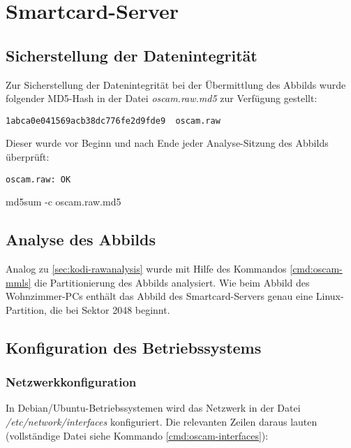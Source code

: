 \section{Smartcard-Server}

\subsection{Sicherstellung der Datenintegrität}

Zur Sicherstellung der Datenintegrität bei der Übermittlung des Abbilds wurde folgender MD5-Hash in der Datei \textit{oscam.raw.md5} zur Verfügung gestellt:

\begin{verbatim}
1abca0e041569acb38dc776fe2d9fde9  oscam.raw
\end{verbatim}

Dieser wurde vor Beginn und nach Ende jeder Analyse-Sitzung des Abbilds überprüft:

\begin{cmd}
\begin{verbatim}
oscam.raw: OK
\end{verbatim}
\caption{md5sum -c oscam.raw.md5}
\end{cmd}

\subsection{Analyse des Abbilds}

Analog zu \autoref{sec:kodi-rawanalysis} wurde mit Hilfe des Kommandos \autoref{cmd:oscam-mmls} die Partitionierung des Abbilds analysiert. Wie beim Abbild des Wohnzimmer-PCs enthält das Abbild des Smartcard-Servers genau eine Linux-Partition, die bei Sektor 2048 beginnt.

\subsection{Konfiguration des Betriebssystems}

\subsubsection{Netzwerkkonfiguration}
\label{sec:cardserver-network}

In Debian/Ubuntu-Betriebssystemen wird das Netzwerk in der Datei \textit{/etc/network/interfaces} konfiguriert. Die relevanten Zeilen daraus lauten (vollständige Datei siehe Kommando \autoref{cmd:oscam-interfaces}):


